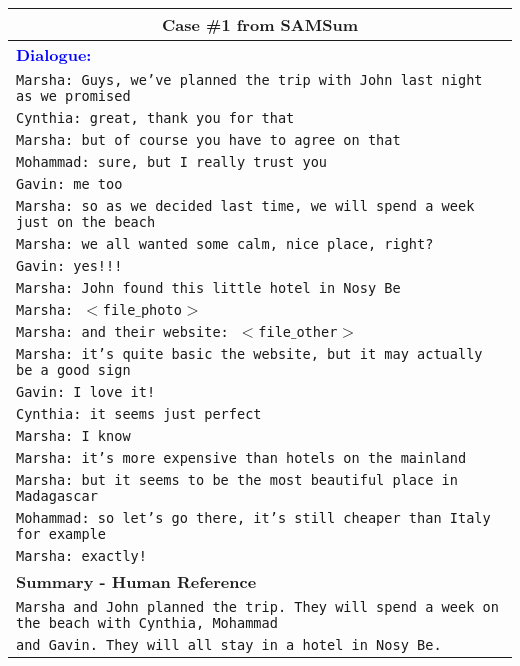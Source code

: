 \documentclass[11pt]{article}
\begin{document}
\begin{table*}[t]
        \centering
        \begin{adjustbox}{width=1.00\textwidth,center}
        \begin{tabular}{ | l | }
        \toprule
        \multicolumn{1}{|c|}{\textbf{Case \#1 from SAMSum}} \\ \hline
        \textbf{\textcolor{blue}{Dialogue:}} \\ \hline
        
        \texttt{Marsha: Guys, we've planned the trip with John last night as we promised} \\ 
        \texttt{Cynthia: great, thank you for that} \\
        \texttt{Marsha: but of course you have to agree on that} \\
        \texttt{Mohammad: sure, but I really trust you} \\
        \texttt{Gavin: me too} \\
        \texttt{Marsha: so as we decided last time, we will spend a week just on the beach} \\
        \texttt{Marsha: we all wanted some calm, nice place, right?} \\
        \texttt{Gavin: yes!!! } \\
        \texttt{Marsha: John found this little hotel in Nosy Be} \\
        \texttt{Marsha: $<$file$\_$photo$>$ } \\
        \texttt{Marsha: and their website: $<$file$\_$other$>$ } \\
        \texttt{Marsha: it's quite basic the website, but it may actually be a good sign} \\
        \texttt{Gavin: I love it!} \\
        \texttt{Cynthia: it seems just perfect} \\
        \texttt{Marsha: I know} \\
        \texttt{Marsha: it's more expensive than hotels on the mainland} \\
        \texttt{Marsha: but it seems to be the most beautiful place in Madagascar} \\
        \texttt{Mohammad: so let's go there, it's still cheaper than Italy for example} \\
        \texttt{Marsha: exactly!} \\
        \hline \hline
        
        \textbf{Summary - Human Reference} \\ \hline
        \texttt{Marsha and John planned the trip. They will spend a week on the beach with Cynthia, Mohammad} \\ 
        \texttt{and Gavin. They will all stay in a hotel in Nosy Be.} \\ \hline
        

\end{tabular}
\end{adjustbox}
\end{table*}
\end{document}

